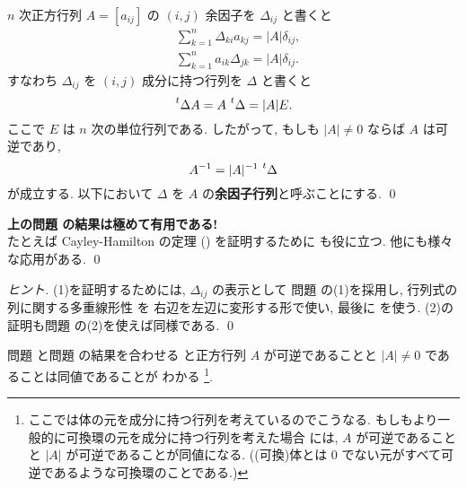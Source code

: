 \documentclass[12pt,twoside]{jarticle}
\begin{document}

\begin{question}[行列式の余因子展開]
  \label{q:cofactor-exp}
  $n$ 次正方行列 $A=[a_{ij}]$ の $(i,j)$ 余因子を $\Delta_{ij}$ と書くと
  \begin{align*}
    &
    \sum_{k=1}^n \Delta_{ki}a_{kj} = |A| \delta_{ij},
    \tag{1}
    \\ &
    \sum_{k=1}^n a_{ik}\Delta_{jk} = |A| \delta_{ij}.
    \tag{2}
  \end{align*}
  すなわち $\Delta_{ij}$ を $(i,j)$ 成分に持つ行列を $\Delta$ と書くと
  \begin{equation*}
    \tp{\Delta}A = A\,\tp{\Delta} = |A|E.
  \end{equation*}
  ここで $E$ は $n$ 次の単位行列である. 
  したがって, もしも $|A|\ne 0$ ならば $A$ は可逆であり,
  \begin{equation*}
    A^{-1} = |A|^{-1}\,\tp{\Delta}
  \end{equation*}
  が成立する. 
  以下において $\Delta$ を $A$ の{\bf 余因子行列}と呼ぶことにする.
  \qed
\end{question}

\begin{rem}
  {\bf\Large 上の問題  の結果は極めて有用である!}
  \\たとえば Cayley-Hamilton の定理 () を証明するために
  も役に立つ.  他にも様々な応用がある.
  \qed
\end{rem}

\begin{proof}[ヒント]
  (1)を証明するためには, $\Delta_{ij}$ の表示として
  問題  の(1)を採用し, 
  行列式の列に関する多重線形性  を
  右辺を左辺に変形する形で使い, 最後に  を使う.
  (2)の証明も問題  の(2)を使えば同様である.
  \qed
\end{proof}

\begin{rem}
  問題  と問題  の結果を合わせる
  と正方行列 $A$ が可逆であることと $|A|\ne 0$ であることは同値であることが
  わかる%
  \footnote{ここでは体の元を成分に持つ行列を考えているのでこうなる.
    もしもより一般的に可換環の元を成分に持つ行列を考えた場合
    には, $A$ が可逆であることと $|A|$ が可逆であることが同値になる.
    ((可換)体とは $0$ でない元がすべて可逆であるような可換環のことである.)}.
\end{rem}
\end{document}
